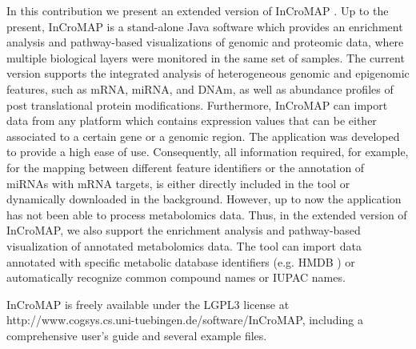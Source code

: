 \documentclass[final,5p,times,twocolumn]{elsarticle}
\begin{document}
In this contribution we present an extended version of InCroMAP \cite{Wrzodek2012a,Wrzodek2012b}. Up to the present, InCroMAP is a stand-alone Java software which provides an enrichment analysis and pathway-based visualizations of genomic and proteomic data, where multiple biological layers were monitored in the same set of samples. The current version supports the integrated analysis of heterogeneous genomic and epigenomic features, such as mRNA, miRNA, and DNAm, as well as abundance profiles of post translational protein modifications. Furthermore, InCroMAP can import data from any platform which contains expression values that can be either associated to a certain gene or a genomic region. The application was developed to provide a high ease of use. Consequently, all information required, for example, for the mapping between different feature identifiers or the annotation of miRNAs with mRNA targets, is either directly included in the tool or dynamically downloaded in the background. However, up to now the application has not been able to process metabolomics data. Thus, in the extended version of InCroMAP, we also support the enrichment analysis and pathway-based visualization of annotated metabolomics data. The tool can import data annotated with specific metabolic database identifiers (e.g. HMDB \cite{Wishart2009}) or automatically recognize common compound names or IUPAC names.

InCroMAP is freely available under the LGPL3 license at http://www.cogsys.cs.uni-tuebingen.de/software/InCroMAP, including a comprehensive user’s guide and several example files.
\end{document}
